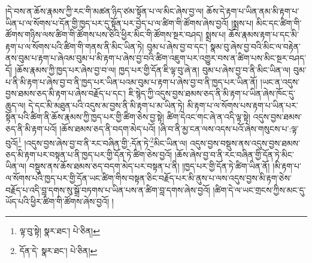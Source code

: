 །དེ་བས་ན་ཆོས་རྣམས་ཀྱི་རང་གི་མཚན་ཉིད་ཙམ་སྟོན་པ་ལ་མིང་ཞེས་བྱ་ལ། ཆོས་དེ་རྟག་པ་ཡིན་ནམ་མི་རྟག་པ་ཡིན་པ་ལ་སོགས་པ་དོན་གྱི་ཁྱད་པར་དུ་སྟོན་པར་བྱེད་པ་ལ་ཚིག་གི་ཚོགས་ཞེས་བྱའོ། །སྨྲས་པ། མིང་དང་ཚིག་གི་ཚོགས་གཉིས་ལས་ཚིག་གི་ཚོགས་པས་ཅིའི་ཕྱིར་མིང་གི་ཚོགས་སྔར་བཤད། སྨྲས་པ། ཆོས་རྣམས་རྟག་པ་དང་མི་རྟག་པ་ལ་སོགས་པའི་ཚིག་གི་གནས་ནི་མིང་ཡིན་ཏེ། བུམ་པ་ཞེས་བྱ་བ་དང་། སྣམ་བུ་ཞེས་བྱ་བའི་མིང་ལ་བརྟེན་ནས་བུམ་པ་རྟག་པ་ཞེའམ་བུམ་པ་མི་རྟག་པ་ཞེས་བྱ་བའི་ཚིག་འཇུག་པར་འགྱུར་བས་ན་ཚིག་པས་མིང་སྔར་བཤད་དོ། །ཆོས་རྣམས་ཀྱི་ཁྱད་པར་ཞེས་བྱ་བ་ལ། ཁྱད་པར་གྱི་དོན་ཇི་ལྟ་བུ་ཞེ་ན། བུམ་པ་ཞེས་བྱ་བ་ནི་མིང་ཡིན་ལ། བུམ་པ་ནི་མི་རྟག་པ་ཞེས་བྱ་བ་ནི་ཁྱད་པར་ཡིན་པའམ་བུམ་པ་རྟག་པ་ཞེས་བྱ་བ་ནི་ཁྱད་པར་ཡིན་ནོ། །ཡང་ན་འདུས་བྱས་ཐམས་ཅད་མི་རྟག་པ་ཞེས་བརྗོད་པ་དང་། ཇི་སྙེད་ཀྱི་འདུས་བྱས་ཐམས་ཅད་ནི་མི་རྟག་པ་ཡིན་ཞེས་ཁོང་དུ་ཆུད་ལ། དེ་དང་མི་མཐུན་པའི་འདུས་མ་བྱས་ནི་མི་རྟག་པ་མ་ཡིན་ཏེ། མི་རྟག་པ་ལ་སོགས་པས་རྟག་པ་ཡིན་པར་སྟོན་པའི་ཚིག་ནི་ཆོས་རྣམས་ཀྱི་ཁྱད་པར་གྱི་ཚིག་ཅེས་བྱ་སྟེ། ཚིག་དེའང་གང་ཞེ་ན་འདི་ལྟ་སྟེ། འདུས་བྱས་ཐམས་ཅད་ནི་མི་རྟག་པའོ། །ཆོས་ཐམས་ཅད་ནི་བདག་མེད་པའོ། །ཞི་བ་ནི་མྱ་ངན་ལས་འདས་པའོ་ཞེས་གསུངས་པ་:ལྟ་བུའོ།\footnote{ལྟ་བུ་སྟེ།  སྣར་ཐང་།  པེ་ཅིན། } །འདུས་བྱས་ཞེས་བྱ་བ་ནི་རང་བཞིན་གྱི་:དོན་ཏེ་\footnote{དོན་དེ་  སྣར་ཐང་།  པེ་ཅིན། }མིང་ཡིན་ལ། འདུས་བྱས་བསྡུས་ནས་འདུས་བྱས་ཐམས་ཅད་མི་རྟག་པར་བསྟན་པ་ནི་ཁྱད་པར་གྱི་དོན་ཏེ་ཚིག་ཅེས་བྱའོ། །ཆོས་ཞེས་བྱ་བ་ནི་རང་བཞིན་གྱི་དོན་ཏེ་མིང་ཡིན་ལ། བསྡུས་ནས་ཆོས་ཐམས་ཅད་བདག་མེད་པར་བསྟན་པ་ནི། །ཁྱད་པར་གྱི་དོན་ཏེ་ཚིག་ཡིན་ནོ། །མི་རྟག་པ་ལ་སོགས་པའི་ཁྱད་པར་གྱི་དོན་ཡང་ཚིག་གིས་བསྟན་ཅིང་བརྗོད་པར་མི་ནུས་པ་ལས་འདུས་བྱས་མི་རྟག་ཅེས་བརྗོད་པ་འདི་བླ་དགས་སུ་སྒྲོ་བཏགས་པ་ཡིན་པས་ན་ཚིག་བླ་དགས་ཞེས་བྱའོ། །ཚིག་དེ་ལ་ཡང་གྲངས་ཀྱིས་མང་དུ་ཡོད་པའི་ཕྱིར་ཚིག་གི་ཚོགས་ཞེས་བྱའོ། །
